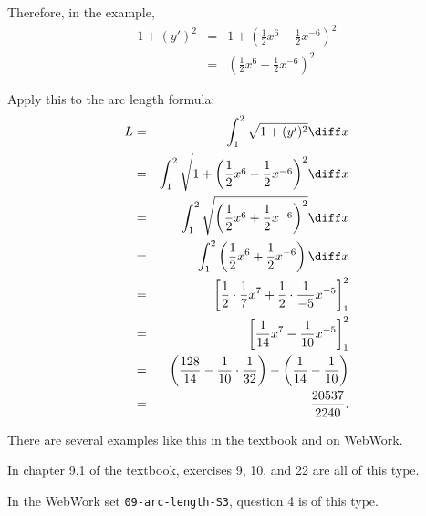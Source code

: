 Therefore, in the example,
\begin{eqnarray*}
1 + (y')^2 & = & 1 + \left( \frac{1}{2}x^6 - \frac{1}{2}x^{-6}\right)^2\\
 & = & \left( \frac{1}{2}x^6 + \frac{1}{2}x^{-6}\right)^2.
\end{eqnarray*}

Apply this to the arc length formula:
\begin{eqnarray*}
L & = & \int_1^2 \sqrt{1 + (y')^2}\diff x\\
& = & \int_1^2 \sqrt{1 + \left( \frac{1}{2}x^6 - \frac{1}{2}x^{-6}\right)^2}\diff x\\
& = & \int_1^2 \sqrt{\left(\frac{1}{2}x^6 + \frac{1}{2}x^{-6}\right)^2}\diff x\\
& = & \int_1^2 \left( \frac{1}{2}x^6 + \frac{1}{2}x^{-6}\right)\diff x\\
& = & \left[ \frac{1}{2}\cdot \frac{1}{7}x^7 + \frac{1}{2} \cdot \frac{1}{-5}x^{-5}\right]_1^2\\
& = & \left[ \frac{1}{14}x^7 - \frac{1}{10}x^{-5}\right]_1^2\\
& = & \left( \frac{128}{14} - \frac{1}{10}\cdot \frac{1}{32}\right) - \left( \frac{1}{14} - \frac{1}{10}\right) \\
& = & \frac{20537}{2240}.
\end{eqnarray*}

There are several examples like this in the textbook and on WebWork.

In chapter 9.1 of the textbook, exercises 9, 10, and 22 are all of this type.

In the WebWork set \texttt{09-arc-length-S3}, question 4 is of this type.



